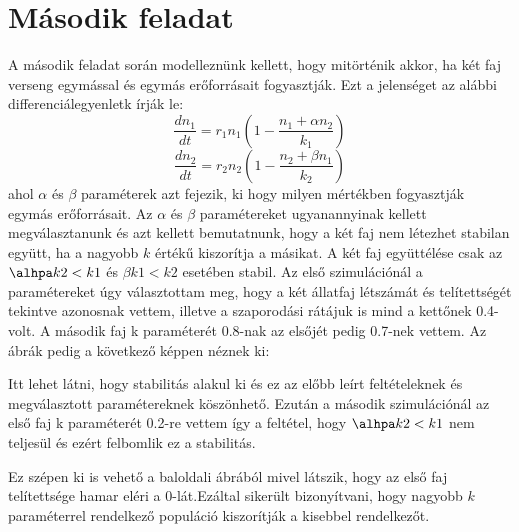 \documentclass{article}[18pt]
\begin{document}
\section{Második feladat}
A második feladat során modelleznünk kellett, hogy mitörténik akkor, ha két faj verseng egymással és egymás erőforrásait fogyasztják. Ezt a jelenséget az alábbi differenciálegyenletk írják le:
\begin{equation}
    \frac{dn_1}{dt}=r_{1}n_{1}(1-\frac{n_{1}+\alpha n_{2}}{k_{1}})
    \label{visibility}
\end{equation}
\begin{equation}
    \frac{dn_2}{dt}=r_{2}n_{2}(1-\frac{n_{2}+\beta n_{1}}{k_{2}})
    \label{visibility}
\end{equation}
ahol $\alpha$ és $\beta$ paraméterek azt fejezik, ki hogy milyen mértékben fogyasztják egymás erőforrásait. Az $\alpha$ és $\beta$ paramétereket ugyanannyinak kellett megválasztanunk és azt kellett bemutatnunk, hogy a két
faj nem létezhet stabilan együtt, ha a nagyobb $k$ értékű kiszorítja a másikat. A két faj együttélése csak az $\alhpa k2 < k1$ és
$\beta k1 < k2$ esetében stabil. Az első szimulációnál a paramétereket úgy választottam meg, hogy a két állatfaj létszámát és telítettségét tekintve azonosnak vettem, illetve a szaporodási rátájuk is mind a kettőnek 0.4-volt. A második faj k paraméterét 0.8-nak az elsőjét pedig 0.7-nek vettem.
\newpage
Az ábrák pedig a következő képpen néznek ki:
\begin{figure}[h]
    \centering
    \qquad
\end{figure}

Itt lehet látni, hogy stabilitás alakul ki és ez az előbb leírt feltételeknek és megválasztott paramétereknek köszönhető. Ezután a második szimulációnál az első faj k paraméterét 0.2-re vettem így a feltétel, hogy $\alhpa k2 < k1$ nem teljesül és ezért felbomlik ez a stabilitás.
\begin{figure}[h]
    \centering
    \qquad
\end{figure}

Ez szépen ki is vehető a baloldali ábrából mivel látszik, hogy az első faj telítettsége hamar eléri a 0-lát.Ezáltal sikerült bizonyítvani, hogy nagyobb $k$ paraméterrel rendelkező populáció kiszorítják a kisebbel rendelkezőt.
\newpage
\end{document}
